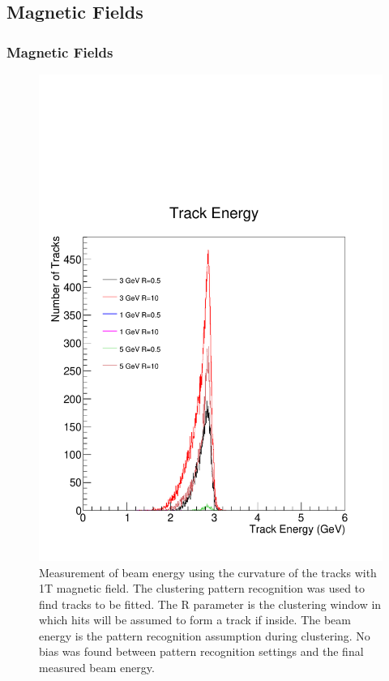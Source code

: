\documentclass{beamer}
\begin{document}
\subsection{Magnetic Fields}
\begin{frame}
\frametitle{Magnetic Fields}
\begin{figure}
\includegraphics[width=0.45\linewidth]{pics/beamE3B1.pdf}
\tiny{
\caption{\tiny{Measurement of beam energy using the curvature of the tracks with 1T magnetic field. The clustering pattern recognition was used to find tracks to be fitted. The R parameter is the clustering window in which hits will be assumed to form a track if inside. The beam energy is the pattern recognition assumption during clustering. No bias was found between pattern recognition settings and the final measured beam energy.}}
}
\end{figure}
\end{frame}
\end{document}
